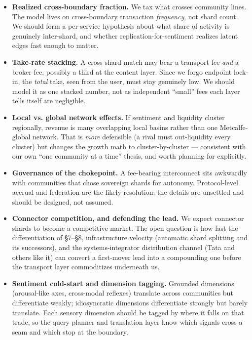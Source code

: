\documentclass[11pt]{article}
\begin{document}
\begin{itemize}[leftmargin=1.4em, itemsep=6pt]
  \item \textbf{Realized cross-boundary fraction.} We tax what crosses community lines. The model lives on cross-boundary transaction \emph{frequency}, not shard count. We should form a per-service hypothesis about what share of activity is genuinely inter-shard, and whether replication-for-sentiment realizes latent edges fast enough to matter.
  \item \textbf{Take-rate stacking.} A cross-shard match may bear a transport fee \emph{and} a broker fee, possibly a third at the content layer. Since we forgo endpoint lock-in, the \emph{total} take, seen from the user, must stay genuinely low. We should model it as one stacked number, not as independent ``small'' fees each layer tells itself are negligible.
  \item \textbf{Local vs. global network effects.} If sentiment and liquidity cluster regionally, revenue is many overlapping local basins rather than one Metcalfe-global network. That is \emph{more} defensible (a rival must out-liquidity every cluster) but changes the growth math to cluster-by-cluster --- consistent with our own ``one community at a time'' thesis, and worth planning for explicitly.
  \item \textbf{Governance of the chokepoint.} A fee-bearing interconnect sits awkwardly with communities that chose sovereign shards for autonomy. Protocol-level accrual and federation are the likely resolution; the details are unsettled and should be designed, not assumed.
  \item \textbf{Connector competition, and defending the lead.} We expect connector shards to become a competitive market. The open question is how fast the differentiation of \S7--\S8, infrastructure velocity (automatic shard splitting and its successors), and the systems-integrator distribution channel (Tata and others like it) can convert a first-mover lead into a compounding one before the transport layer commoditizes underneath us.
  \item \textbf{Sentiment cold-start and dimension tagging.} Grounded dimensions (arousal-like axes, cross-modal reflexes) translate across communities but differentiate weakly; idiosyncratic dimensions differentiate strongly but barely translate. Each sensory dimension should be tagged by where it falls on that trade, so the query planner and translation layer know which signals cross a seam and which stop at the boundary.
\end{itemize}
\end{document}
